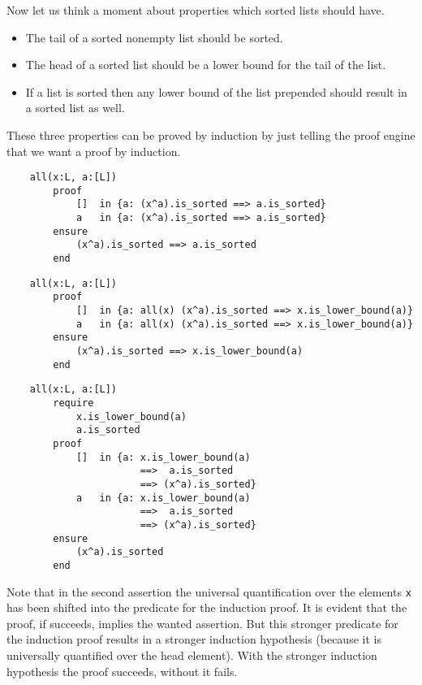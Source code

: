 Now let us think a moment about properties which sorted lists should have.
\begin{itemize}
\item The tail of a sorted nonempty list should be sorted.
\item The head of a sorted list should be a lower bound for the tail of the list.
\item If a list is sorted then any lower bound of the list prepended should
  result in a sorted list as well.
\end{itemize}

These three properties can be proved by induction by just telling the proof
engine that we want a proof by induction.

\begin{lstlisting}
    all(x:L, a:[L])
        proof
            []  in {a: (x^a).is_sorted ==> a.is_sorted}
            a   in {a: (x^a).is_sorted ==> a.is_sorted}
        ensure
            (x^a).is_sorted ==> a.is_sorted
        end
\end{lstlisting}

\begin{lstlisting}
    all(x:L, a:[L])
        proof
            []  in {a: all(x) (x^a).is_sorted ==> x.is_lower_bound(a)}
            a   in {a: all(x) (x^a).is_sorted ==> x.is_lower_bound(a)}
        ensure
            (x^a).is_sorted ==> x.is_lower_bound(a)
        end
\end{lstlisting}

\begin{lstlisting}
    all(x:L, a:[L])
        require
            x.is_lower_bound(a)
            a.is_sorted
        proof
            []  in {a: x.is_lower_bound(a)
                       ==>  a.is_sorted
                       ==> (x^a).is_sorted}
            a   in {a: x.is_lower_bound(a)
                       ==>  a.is_sorted
                       ==> (x^a).is_sorted}
        ensure
            (x^a).is_sorted
        end
\end{lstlisting}

Note that in the second assertion the universal quantification over the
elements \lstinline!x! has been shifted into the predicate for the induction
proof. It is evident that the proof, if succeeds, implies the wanted
assertion. But this stronger predicate for the induction proof results in a
stronger induction hypothesis (because it is universally quantified over the
head element). With the stronger induction hypothesis the proof succeeds,
without it fails.

